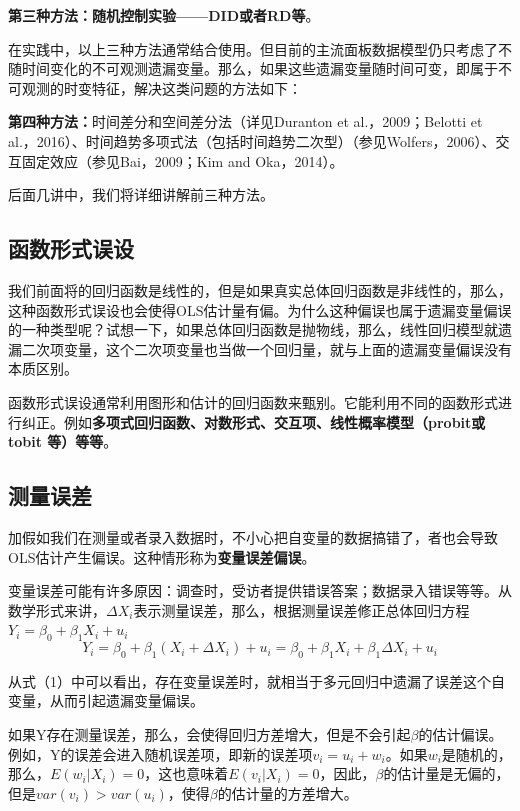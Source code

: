\documentclass[cn,12pt,math=newtx,citestyle=gb7714-2015,bibstyle=gb7714-2015]{elegantbook}
\begin{document}
\textbf{第三种方法：随机控制实验——DID或者RD等}。

在实践中，以上三种方法通常结合使用。但目前的主流面板数据模型仍只考虑了不随时间变化的不可观测遗漏变量。那么，如果这些遗漏变量随时间可变，即属于不可观测的时变特征，解决这类问题的方法如下：

\textbf{第四种方法：}时间差分和空间差分法（详见Duranton et al.，2009；Belotti et al.，2016）、时间趋势多项式法（包括时间趋势二次型）（参见Wolfers，2006）、交互固定效应（参见Bai，2009；Kim and Oka，2014）。

后面几讲中，我们将详细讲解前三种方法。

\subsection{函数形式误设}
我们前面将的回归函数是线性的，但是如果真实总体回归函数是非线性的，那么，这种函数形式误设也会使得OLS估计量有偏。为什么这种偏误也属于遗漏变量偏误的一种类型呢？试想一下，如果总体回归函数是抛物线，那么，线性回归模型就遗漏二次项变量，这个二次项变量也当做一个回归量，就与上面的遗漏变量偏误没有本质区别。

函数形式误设通常利用图形和估计的回归函数来甄别。它能利用不同的函数形式进行纠正。例如\textbf{多项式回归函数、对数形式、交互项、线性概率模型（probit或tobit 等）等等}。

\subsection{测量误差}
加假如我们在测量或者录入数据时，不小心把自变量的数据搞错了，者也会导致OLS估计产生偏误。这种情形称为\textbf{变量误差偏误}。

变量误差可能有许多原因：调查时，受访者提供错误答案；数据录入错误等等。从数学形式来讲，$\Delta{X}_i$表示测量误差，那么，根据测量误差修正总体回归方程$Y_i=\beta_0+\beta_1X_i+u_i$
\begin{equation}
	Y_i=\beta_0+\beta_1(X_i+\Delta{X}_i)+u_i=\beta_0+\beta_1X_i+\beta_1\Delta{X}_i+u_i
\end{equation}

从式（1）中可以看出，存在变量误差时，就相当于多元回归中遗漏了误差这个自变量，从而引起遗漏变量偏误。

如果Y存在测量误差，那么，会使得回归方差增大，但是不会引起$\beta$的估计偏误。例如，Y的误差会进入随机误差项，即新的误差项$v_i=u_i+w_i$。如果$w_i$是随机的，那么，$E(w_i|X_i)=0$，这也意味着$E(v_i|X_i)=0$，因此，$\beta$的估计量是无偏的，但是$var(v_i)>var(u_i)$，使得$\beta$的估计量的方差增大。
\end{document}
